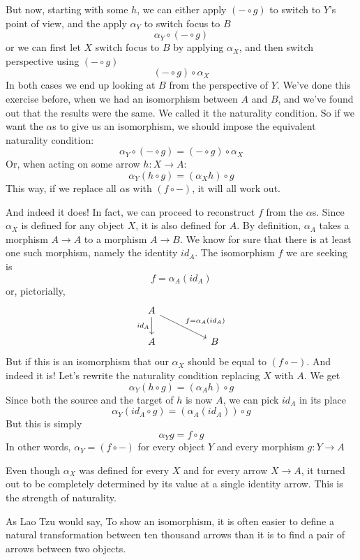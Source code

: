 \documentclass[DaoFP]{subfiles}
\begin{document}
But now, starting with some $h$, we can either apply $(- \circ g)$ to switch to $Y$'s point of view, and the apply $\alpha_Y$ to switch focus to $B$
\[ \alpha_Y \circ (- \circ g) \]
or we can first let $X$ switch focus to $B$ by applying $\alpha_X$, and then switch perspective using $(- \circ g)$
\[ (- \circ g) \circ \alpha_X \]
In both cases we end up looking at $B$ from the perspective of $Y$. We've done this exercise before, when we had an isomorphism between $A$ and $B$, and we've found out that the results were the same. We called it the naturality condition. So if we want the $\alpha$s to give us an isomorphism, we should impose the equivalent naturality condition:
\[ \alpha_Y \circ (- \circ g) = (- \circ g) \circ \alpha_X \]
Or, when acting on some arrow $h \colon X \to A$:
\[\alpha_Y(h \circ g) = (\alpha_X h) \circ g \]
This way, if we replace all $\alpha$s with $(f \circ -)$, it will all work out. 

And indeed it does! In fact, we can proceed to reconstruct $f$ from the $\alpha$s. Since $\alpha_X$ is defined for any object $X$, it is also defined for $A$. By definition, $\alpha_A$ takes a morphism $A \to A$ to a morphism $A \to B$. We know for sure that there is at least one such morphism, namely the identity $id_A$. The isomorphism $f$ we are seeking is
\[f = \alpha_A (id_A)\]
or, pictorially,
\[
 \begin{tikzcd}
 A
 \arrow[d, "id_A"']
 \arrow[rrd, "f = \alpha_A (id_A)"]
  \\
 A
  && B
 \end{tikzcd}
\]
But if this is an isomorphism that our $\alpha_X$ should be equal to  $(f \circ -)$. And indeed it is! Let's rewrite the naturality condition replacing $X$ with $A$. We get
\[\alpha_Y(h \circ g) = (\alpha_A h) \circ g \]
Since both the source and the target of $h$ is now $A$, we can pick $id_A$ in its place
\[\alpha_Y (id_A \circ g) = (\alpha_A (id_A)) \circ g \]
But this is simply
\[\alpha_Y g = f \circ g \]
In other words, $\alpha_Y = (f \circ -)$ for every object $Y$ and every morphism $g \colon Y \to A$

Even though $\alpha_X$ was defined for every $X$ and for every arrow $X \to A$, it turned out to be completely determined by its value at a single identity arrow. This is the strength of naturality.

As Lao Tzu would say, To show an isomorphism, it is often easier to define a natural transformation between ten thousand arrows than it is to find a pair of arrows between two objects.
\end{document}
